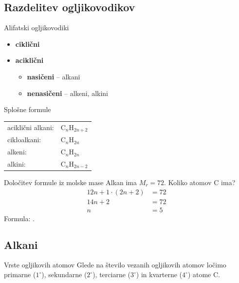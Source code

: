 \documentclass{article}
\begin{document}
\subsection{Razdelitev ogljikovodikov}

\begin{defbox}{Alifatski ogljikovodiki}
\begin{itemize}[noitemsep]
    \item \textbf{ciklični}
    \item \textbf{aciklični}
    \begin{itemize}[noitemsep]
        \item \textbf{nasičeni} -- alkani
        \item \textbf{nenasičeni} -- alkeni, alkini
    \end{itemize}
\end{itemize}
\end{defbox}

\begin{rpbox}{Splošne formule}
\begin{center}
\begin{tabular}{ll}
aciklični alkani: & $\mathrm{C}_n\mathrm{H}_{2n+2}$ \\
cikloalkani:      & $\mathrm{C}_n\mathrm{H}_{2n}$ \\
alkeni:           & $\mathrm{C}_n\mathrm{H}_{2n}$ \\
alkini:           & $\mathrm{C}_n\mathrm{H}_{2n-2}$ \\
\end{tabular}
\end{center}
\end{rpbox}

\begin{zgledbox}{Določitev formule iz molske mase}
Alkan ima $M_r = 72$. Koliko atomov C ima?
\begin{align*}
12n + 1\cdot(2n+2) &= 72 \\
14n + 2 &= 72 \\
n &= 5
\end{align*}
Formula: .
\end{zgledbox}

\subsection{Alkani}

\begin{defbox}{Vrste ogljikovih atomov}
Glede na število vezanih ogljikovih atomov ločimo primarne ($1^\circ$),
sekundarne ($2^\circ$), terciarne ($3^\circ$) in kvarterne ($4^\circ$) atome C.
\end{defbox}
\end{document}
